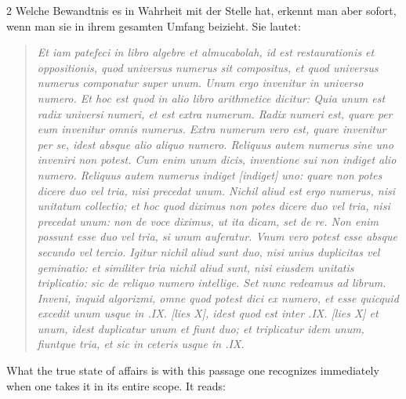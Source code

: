 \documentclass[10pt,a4paper]{article}
\renewcommand{\switchcolumn}{\syncronize\nointerlineskip\columnbreak}
\begin{document}
\begin{paracol}{2}
Welche Bewandtnis es in Wahrheit mit der Stelle hat, erkennt man aber sofort, wenn man sie in ihrem gesamten Umfang beizieht. Sie lautet:

\begin{quote}
\textit{Et iam patefeci in libro algebre et almucabolah, id est restaurationis et oppositionis, quod universus numerus sit compositus, et quod universus numerus componatur super unum. Unum ergo invenitur in universo numero. Et hoc est quod in alio libro arithmetice dicitur: Quia unum est radix universi numeri, et est extra numerum. Radix numeri est, quare per eum invenitur omnis numerus. Extra numerum vero est, quare invenitur per se, idest absque alio aliquo numero. Reliquus autem numerus sine uno inveniri non potest. Cum enim unum dicis, inventione sui non indiget alio numero. Reliquus autem numerus indiget [indiget] uno: quare non potes dicere duo vel tria, nisi precedat unum. Nichil aliud est ergo numerus, nisi unitatum collectio; et hoc quod diximus non potes dicere duo vel tria, nisi precedat unum: non de voce diximus, ut ita dicam, set de re. Non enim possunt esse duo vel tria, si unum auferatur. Vnum vero potest esse absque secundo vel tercio. Igitur nichil aliud sunt duo, nisi unius duplicitas vel geminatio: et similiter tria nichil aliud sunt, nisi eiusdem unitatis triplicatio: sic de reliquo numero intellige. Set nunc redeamus ad librum. Inveni, inquid algorizmi, omne quod potest dici ex numero, et esse quicquid excedit unum usque in .IX. [lies X], idest quod est inter .IX. [lies X] et unum, idest duplicatur unum et fiunt duo; et triplicatur idem unum, fiuntque tria, et sic in ceteris usque in .IX.}
\end{quote}
\switchcolumn
What the true state of affairs is with this passage one recognizes immediately when one takes it in its entire scope. It reads:


\end{paracol}
\end{document}
